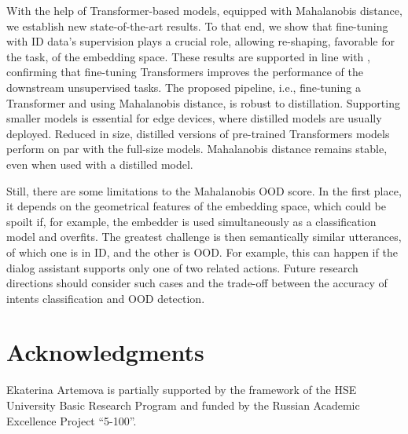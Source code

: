 \documentclass[letterpaper, final]{article} %
\begin{document}
With the help of Transformer-based models, equipped with Mahalanobis distance, we establish new state-of-the-art results. To that end, we show that fine-tuning with ID data's supervision plays a crucial role, allowing re-shaping, favorable for the task, of the embedding space. These results are supported in line with \cite{reimers2019sentence}, confirming that fine-tuning Transformers improves the performance of the downstream unsupervised tasks. The proposed pipeline, i.e., fine-tuning a Transformer and using Mahalanobis distance, is robust to distillation. Supporting smaller models is essential for edge devices, where distilled models are usually deployed. Reduced in size, distilled versions of pre-trained Transformers models perform on par with the full-size models. Mahalanobis distance remains stable, even when used with a distilled model.

Still, there are some limitations to the Mahalanobis OOD score. In the first place, it depends on the geometrical features of the embedding space, which could be spoilt if, for example, the embedder is used simultaneously as a classification model and overfits. The greatest challenge is then semantically similar utterances, of which one is in ID, and the other is OOD. For example, this can happen if the dialog assistant supports only one of two related actions. Future research directions should consider such cases and the trade-off between the accuracy of intents classification and OOD detection.


\section*{Acknowledgments}
Ekaterina Artemova is partially supported by the framework of the HSE University Basic Research Program and funded by the Russian Academic Excellence Project  ``5-100''.
\end{document}
